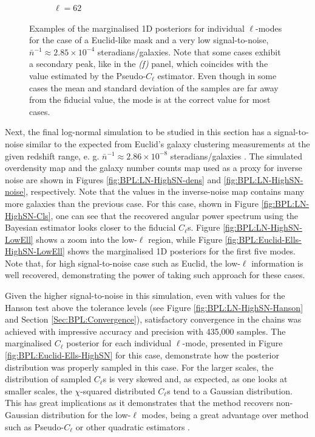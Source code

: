 \begin{figure}
\begin{subfigure}{.5\textwidth}
  \caption{$\ell = 62$}
\end{subfigure}
\caption[Examples of marginalised 1D posteriors for individual $\ell$-modes for the case of a Euclid-like mask and a very low signal-to-noise.]{Examples of the marginalised 1D posteriors for individual $\ell$-modes for the case of a Euclid-like mask and a very low signal-to-noise, $\bar{n}^{-1}\approx 2.85\times 10^{-4}$ steradians/galaxies. Note that some cases exhibit a secondary peak, like in the \textit{(f)} panel, which coincides with the value estimated by the Pseudo-$C_{\ell}$ estimator. Even though in some cases the mean and standard deviation of the samples are far away from the fiducial value, the mode is at the correct value for most cases.}
\label{fig:BPL:Euclid-Ells}
\end{figure}

\qquad Next, the final log-normal simulation to be studied in this section has a signal-to-noise similar to the expected from Euclid's galaxy clustering measurements at the given redshift range, e. g. $\bar{n}^{-1}\approx 2.86\times 10^{-8}$ steradians/galaxies \citep{2011EuclidRedPaper}. The simulated overdensity map and the galaxy number counts map used as a proxy for inverse noise are shown in Figures \ref{fig:BPL:LN-HighSN-dens} and \ref{fig:BPL:LN-HighSN-noise}, respectively. Note that the values in the inverse-noise map contains many more galaxies than the previous case. For this case, shown in Figure \ref{fig:BPL:LN-HighSN-Cls}, one can see that the recovered angular power spectrum using the Bayesian estimator looks closer to the fiducial $C_{\ell}$s. Figure \ref{fig:BPL:LN-HighSN-LowEll} shows a zoom into the low-$\ell$ region, while Figure \ref{fig:BPL:Euclid-Ells-HighSN-LowEll} shows the marginalised 1D posteriors for the first five modes. Note that, for high signal-to-noise case such as Euclid, the low-$\ell$ information is well recovered, demonstrating the power of taking such approach for these cases.

\qquad Given the higher signal-to-noise in this simulation, even with values for the Hanson test above the tolerance levels (see Figure \ref{fig:BPL:LN-HighSN-Hanson} and Section \ref{Sec:BPL:Convergence}), satisfactory convergence in the chains was achieved with impressive accuracy and precision with 435,000 samples. The marginalised $C_{\ell}$ posterior for each individual $\ell$-mode, presented in Figure \ref{fig:BPL:Euclid-Ells-HighSN} for this case, demonstrate how the posterior distribution was properly sampled in this case. For the larger scales, the distribution of sampled $C_{\ell}$s is very skewed and, as expected, as one looks at smaller scales, the $\chi$-squared distributed $C_{\ell}$s tend to a Gaussian distribution. This has great implications as it demonstrates that the method recovers non-Gaussian distribution for the low-$\ell$ modes, being a great advantage over method such as Pseudo-$C_{\ell}$ or other quadratic estimators \citep{1994Gorsky,1997Tegmark,Hobson2002,Efstat2004,Boris2013}. 

